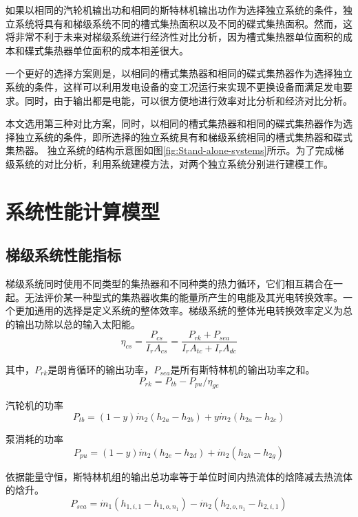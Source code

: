 	如果以相同的汽轮机输出功和相同的斯特林机输出功作为选择独立系统的条件，独立系统将具有和梯级系统不同的槽式集热面积以及不同的碟式集热面积。然而，这将非常不利于未来对梯级系统进行经济性对比分析，因为槽式集热器单位面积的成本和碟式集热器单位面积的成本相差很大。
	
	一个更好的选择方案则是，以相同的槽式集热器和相同的碟式集热器作为选择独立系统的条件，这样可以利用发电设备的变工况运行来实现不更换设备而满足发电要求。同时，由于输出都是电能，可以很方便地进行效率对比分析和经济对比分析。

本文选用第三种对比方案，同时，以相同的槽式集热器和相同的碟式集热器作为选择独立系统的条件，即所选择的独立系统具有和梯级系统相同的槽式集热器和碟式集热器。
独立系统的结构示意图如图\ref{fig:Stand-alone-systems}所示。为了完成梯级系统的对比分析，利用系统建模方法，对两个独立系统分别进行建模工作。

\section{系统性能计算模型}
\subsection{梯级系统性能指标}

梯级系统同时使用不同类型的集热器和不同种类的热力循环，它们相互耦合在一起。无法评价某一种型式的集热器收集的能量所产生的电能及其光电转换效率。一个更加通用的选择是定义系统的整体效率。梯级系统的整体光电转换效率定义为总的输出功除以总的输入太阳能。
\begin{equation}
	\eta_{cs}=\dfrac{P_{cs}}{I_rA_{cs}} = \dfrac{P_{rk}+ P_{sea}}{I_rA_{tc} + I_rA_{dc}}
\end{equation}

其中，$P_{rk}$是朗肯循环的输出功率，$P_{sea}$是所有斯特林机的输出功率之和。
\begin{equation}
	P_{rk} = P_{tb} - P_{pu} / \eta_{ge}
\end{equation}

汽轮机的功率
\begin{equation}
  P_{tb}=\left(1-y\right)\dot{m}_{2}\left(h_{2a}-h_{2b}\right)+y\dot{m}_{2}\left(h_{2a}-h_{2c}\right)
\end{equation}

泵消耗的功率
\begin{equation}
	P_{pu}=\left(1-y\right)\dot{m}_{2}\left(h_{2e}-h_{2d}\right)+\dot{m}_{2}\left(h_{2h}-h_{2g}\right)
\end{equation}

依据能量守恒，斯特林机组的输出总功率等于单位时间内热流体的焓降减去热流体的焓升。
\begin{equation}
	P_{sea}=\dot{m}_1(h_{1,i,1} - h_{1,o,n_1}) - \dot{m}_2(h_{2,o,n_1} - h_{2,i,1})
\end{equation}

